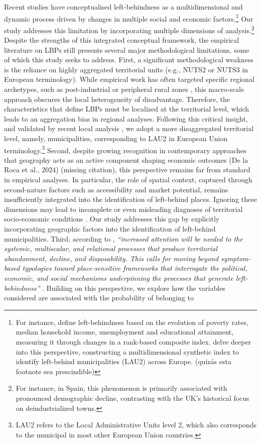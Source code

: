 \documentclass[a4paper,11pt,oneside]{article}
\begin{document}
Recent studies have conceptualised left-behindness as a multidimensional and dynamic process driven by changes in multiple social and economic factors.\footnote{For instance, \cite{connor2024gets} define left-behindness based on the evolution of poverty rates, median household income, unemployment and educational attainment, measuring it through changes in a rank-based composite index. \cite{Perancho2025} delve deeper into this perspective, constructing a multidimensional synthetic index to identify left-behind municipalities (LAU2) across Europe. \color{red} (quizás esta footnote sea prescindible) } Our study addresses this limitation by incorporating multiple dimensions of analysis.\footnote{For instance, in Spain, this phenomenon is primarily associated with pronounced demographic decline, contrasting with the UK's historical focus on deindustrialized towns.} Despite the strengths of this integrated conceptual framework, the empirical literature on LBPs still presents several major methodological limitations, some of which this study seeks to address. First, a significant methodological weakness is the reliance on highly aggregated territorial units (e.g., NUTS2 or NUTS3 in European terminology). While empirical work has often targeted specific regional archetypes, such as post-industrial or peripheral rural zones \citep[see][]{guilluy2019twilight, mackinnon2021reframing}, this macro-scale approach obscures the local heterogeneity of disadvantage. Therefore, the characteristics that define LBPs must be localized at the territorial level, which leads to an aggregation bias in regional analyses. Following this critical insight, and validated by recent local analysis \citep{Perancho2025,alama2021drivers}, we adopt a more disaggregated territorial level, namely, municipalities, corresponding to LAU2 in European Union terminology.\footnote{LAU2 refers to the Local Administrative Units level 2, which also corresponds to the municipal in most other European Union countries.} Second, despite growing recognition in contemporary approaches that geography acts as an active component shaping economic outcomes {\color{red} (De la Roca et al., 2024) (missing citation)}, this perspective remains far from standard in empirical analyses. In particular, the role of spatial context, captured through second-nature factors such as accessibility and market potential, remains insufficiently integrated into the identification of left-behind places. Ignoring these dimensions may lead to incomplete or even misleading diagnoses of territorial socio-economic conditions \citep{iammarino2019regional}. Our study addresses this gap by explicitly incorporating geographic factors into the identification of left-behind municipalities.  Third; according to \cite{phelps2025abandoned}, \textit{``increased attention will be needed to the systemic, multiscalar, and relational processes that produce territorial abandonment, decline, and disposability. This calls for moving beyond symptom-based typologies toward place-sensitive frameworks that interrogate the political, economic, and social mechanisms underpinning the processes that generate left-behindness''} \citep[p.8]{phelps2025abandoned}. Building on this perspective, we explore how the variables considered are associated with the probability of belonging to 
\end{document}
